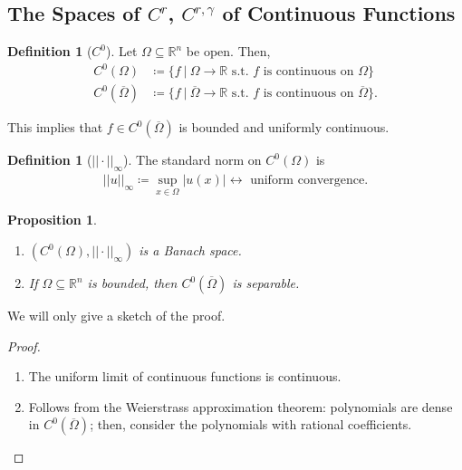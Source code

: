 \documentclass[psamsfonts]{amsart}
\newtheorem{prop}[thm]{Proposition}
\theoremstyle{definition}
\newtheorem{defn}[thm]{Definition}
\theoremstyle{remark}
\newcommand{\R}[0]{\mathbb{R}}
\numberwithin{equation}{section}
\begin{document}
\subsection{The Spaces of \( C^r \), \( C^{r, \gamma} \) of Continuous Functions}

\begin{defn}[\(C^0 \)]
	Let \( \Omega \subseteq \R^n \) be open. Then, 
	\begin{align*}
		C^0(\Omega) & \coloneqq \{ f\ |\ \Omega \to \R \text{ s.t. } f \text{ is continuous on } \Omega \}  \\
		C^0(\overline{\Omega}) & \coloneqq \{ f\ |\ \overline{\Omega} \rightarrow \R \text{ s.t. } f \text{ is continuous on } \overline{\Omega} \}. 
	\end{align*}
\end{defn}
This implies that \( f \in C^0(\overline{\Omega}) \) is bounded and uniformly continuous.

\begin{defn}[\( || \cdot ||_\infty \)]
		The standard norm on \( C^0(\Omega) \) is
		\begin{align}
			|| u ||_\infty \coloneqq \sup_{x \in \Omega} |u(x) | \leftrightarrow \text{ uniform convergence}. 	
		\end{align}
\end{defn}

\begin{prop}
	\begin{enumerate}
		\item \( (C^0(\Omega), || \cdot ||_\infty ) \) is a Banach space. 
		\item If \( \Omega \subseteq \R^n \) is bounded, then \( C^0(\overline{\Omega})\) is separable.
	\end{enumerate}
\end{prop}
We will only give a sketch of the proof.
\begin{proof}
	\begin{enumerate}
		\item The uniform limit of continuous functions is continuous. 
		\item Follows from the Weierstrass approximation theorem: polynomials are dense in \( C^0(\overline{\Omega}) \); then, consider the polynomials with rational coefficients.
	\end{enumerate}
\end{proof}
\end{document}
